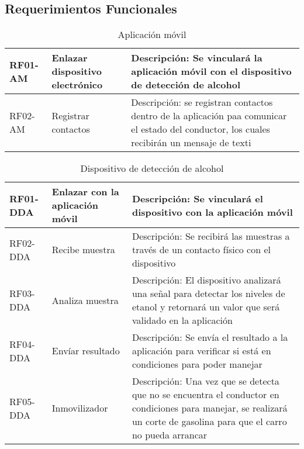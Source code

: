 \subsection{Requerimientos Funcionales} 
  
  \begin{center}
\begin{table}[!htb]
\centering
\begin{tabular}{|p{4cm}|p{4cm}|p{5cm}|}
    \hline
    RF01-AM  & Enlazar dispositivo electrónico & Descripción: Se vinculará la aplicación móvil con el dispositivo de detección de alcohol \\ \hline
    RF02-AM & Registrar contactos & Descripción: se registran contactos dentro de la aplicación paa comunicar el estado del conductor, los cuales recibirán un mensaje de texti \\ 
    \hline
\end{tabular}
\caption{Aplicación móvil}
\label{tabla:pobconlimsincolo}
\end{table}
\end{center}



\begin{center}
\begin{table}[!htb]
\centering
\begin{tabular}{|p{4cm}|p{4cm}|p{5cm}|}
    \hline
    RF01-DDA & Enlazar con la aplicación móvil & Descripción: Se vinculará el dispositivo con la aplicación móvil \\ \hline
    RF02-DDA & Recibe muestra & Descripción: Se recibirá las muestras a través de un contacto físico con el dispositivo \\ \hline
    RF03-DDA & Analiza muestra & Descripción: El dispositivo analizará una señal para detectar los niveles de etanol y retornará un valor que será validado en la aplicación \\ \hline
    RF04-DDA & Envíar resultado & Descripción: Se envía el resultado a la aplicación para verificar si está en condiciones para poder manejar \\ \hline
    RF05-DDA & Inmovilizador & Descripción: Una vez que se detecta que no se encuentra el conductor en condiciones para manejar, se realizará
  un corte de gasolina para que el carro no pueda arrancar \\
    \hline
\end{tabular}
\caption{Dispositivo de detección de alcohol}
\label{tabla:pobconlimsincolo}
\end{table}
\end{center}
